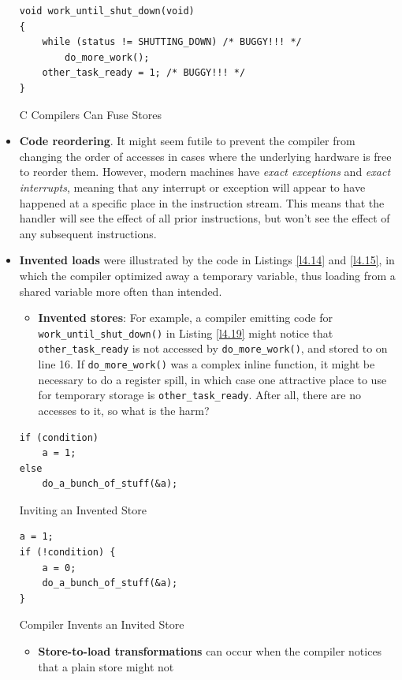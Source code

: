 \documentclass[11pt]{article}
\begin{document}
\begin{itemize}
\begin{listing}[htbp]
\begin{verbatim}
void work_until_shut_down(void)
{
    while (status != SHUTTING_DOWN) /* BUGGY!!! */
        do_more_work();
    other_task_ready = 1; /* BUGGY!!! */
}
\end{verbatim}
\caption{\label{l4.19}C Compilers Can Fuse Stores}
\end{listing}
\item \textbf{Code reordering}. It might seem futile to prevent the compiler from changing the order of accesses in
cases where the underlying hardware is free to reorder them. However, modern machines have \emph{exact
exceptions} and \emph{exact interrupts}, meaning that any interrupt or exception will appear to have
happened at a specific place in the instruction stream. This means that the handler will see the
effect of all prior instructions, but won't see the effect of any subsequent instructions.
\item \textbf{Invented loads} were illustrated by the code in Listings \ref{l4.14} and \ref{l4.15}, in which the compiler
optimized away a temporary variable, thus loading from a shared variable more often than intended.
\begin{itemize}
\item \textbf{Invented stores}: For example, a compiler emitting code for \texttt{work\_until\_shut\_down()} in Listing
\ref{l4.19} might notice that \texttt{other\_task\_ready} is not accessed by \texttt{do\_more\_work()}, and stored to on
line 16. If \texttt{do\_more\_work()} was a complex inline function, it might be necessary to do a register
spill, in which case one attractive place to use for temporary storage is \texttt{other\_task\_ready}. After
all, there are no accesses to it, so what is the harm?
\end{itemize}
\begin{listing}[htbp]
\begin{verbatim}
if (condition)
    a = 1;
else
    do_a_bunch_of_stuff(&a);
\end{verbatim}
\caption{\label{l4.20}Inviting an Invented Store}
\end{listing}
\begin{listing}[htbp]
\begin{verbatim}
a = 1;
if (!condition) {
    a = 0;
    do_a_bunch_of_stuff(&a);
}
\end{verbatim}
\caption{\label{l4.21}Compiler Invents an Invited Store}
\end{listing}
\begin{itemize}
\item \textbf{Store-to-load transformations} can occur when the compiler notices that a plain store might not

\end{itemize}
\end{itemize}
\end{document}
